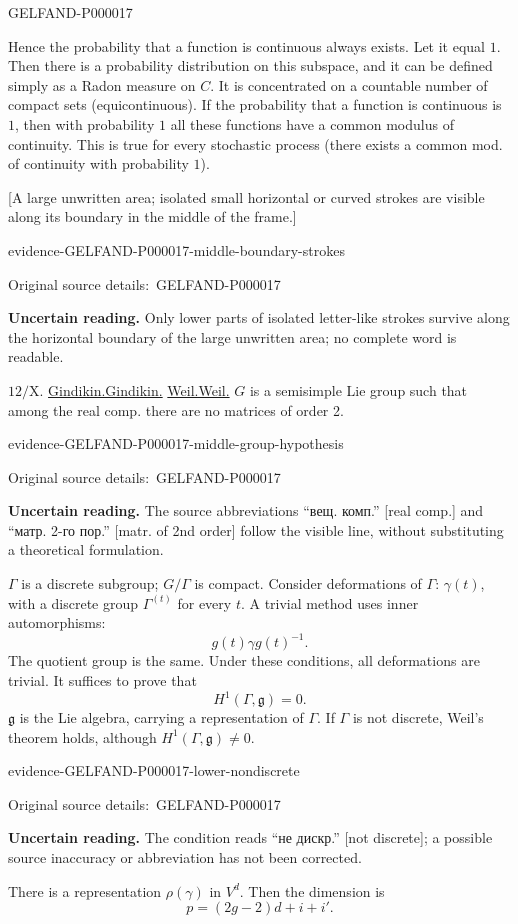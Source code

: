 \documentclass[11pt]{article}
\let\MathUnderline\underline
\renewcommand{\underline}[1]{\ifmmode\MathUnderline{#1}\else\uline{#1}\fi}
\newcommand{\SourcePage}[2]{\par\smallskip\phantomsection\label{#1:source-page}{\small\sffamily\color{blue!55!black}#1}\par\smallskip}
\newcommand{\EvidenceBlock}[4]{%
 \par\smallskip\noindent\begin{minipage}{\linewidth}
 \begin{minipage}[t]{.47\linewidth}\vspace{0pt}\centering
 \csname evidence-#1-#2\endcsname\par
 {\scriptsize\SourceCropCaption\ #1}\par
 \end{minipage}\hfill
 \begin{minipage}[t]{.49\linewidth}\vspace{0pt}\raggedright
 {\small\color{orange!65!black}\textbf{#4} #3}\par
 \end{minipage}
 \end{minipage}\par\smallskip}
\newcommand{\Unclear}[3]{\EvidenceBlock{#1}{#2}{#3}{\ReadingCaption}}
\newcommand{\SourceCropCaption}{Original source details:}\newcommand{\ReadingCaption}{Uncertain reading.}\newcommand{\IncompleteCaption}{Undeciphered passage.}\newcommand{\DiagramCaption}{Diagram and typed description.}
\begin{document}
\SourcePage{GELFAND-P000017}{9}
Hence the probability that a function is continuous always exists.
Let it equal $1$. Then there is a probability distribution on this subspace, and it can be defined simply as a Radon measure on $C$.
It is concentrated on a countable number of compact sets (equicontinuous).
If the probability that a function is continuous is $1$, then with probability $1$ all these functions have a common modulus of continuity.
This is true for every stochastic process (there exists a common mod. of continuity with probability $1$).

[A large unwritten area; isolated small horizontal or curved strokes are visible along its boundary in the middle of the frame.]
\Unclear{GELFAND-P000017}{middle-boundary-strokes}{Only lower parts of isolated letter-like strokes survive along the horizontal boundary of the large unwritten area; no complete word is readable.}

$12/\mathrm X$.
\underline{Gindikin.}
\underline{Weil.} $G$ is a semisimple Lie group such that among the real comp. there are no matrices of order 2.
\Unclear{GELFAND-P000017}{middle-group-hypothesis}{The source abbreviations ``вещ. комп.'' [real comp.] and ``матр. 2-го пор.'' [matr. of 2nd order] follow the visible line, without substituting a theoretical formulation.}
$\Gamma$ is a discrete subgroup; $G/\Gamma$ is compact.
Consider deformations of $\Gamma$: $\gamma(t)$, with a discrete group $\Gamma^{(t)}$ for every $t$.
A trivial method uses inner automorphisms:
\begin{equation*}
g(t)\gamma g(t)^{-1}.
\end{equation*}
The quotient group is the same.
Under these conditions, all deformations are trivial.
It suffices to prove that
\begin{equation*}
H^1(\Gamma,\mathfrak g)=0.
\end{equation*}
$\mathfrak g$ is the Lie algebra, carrying a representation of $\Gamma$.
If $\Gamma$ is not discrete, Weil's theorem holds, although $H^1(\Gamma,\mathfrak g)\ne0$.
\Unclear{GELFAND-P000017}{lower-nondiscrete}{The condition reads ``не дискр.'' [not discrete]; a possible source inaccuracy or abbreviation has not been corrected.}
There is a representation $\rho(\gamma)$ in $V^d$. Then the dimension is
\begin{equation*}
p=(2g-2)d+i+i'.
\end{equation*}
\end{document}
